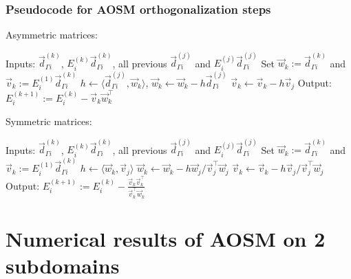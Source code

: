 \documentclass[10pt]{beamer}
\begin{document}
\begin{frame}
\frametitle{Pseudocode for AOSM orthogonalization steps}

Asymmetric matrices:
	\begin{algorithmic}[1]
		\State Inputs: $\vec{d}_{\Gamma i}^{(k)}$, $E_i^{(k)} \vec{d}_{\Gamma i}^{(k)}$, all previous $\vec{d}_{\Gamma i}^{(j)}$ and $E_i^{(j)} \vec{d}_{\Gamma i}^{(j)}$
		\State Set $\vec{w}_k := \vec{d}_{\Gamma i}^{(k)}$ and $\vec{v}_k := E_i^{(1)} \vec{d}_{\Gamma i}^{(k)}$
			\State $h \gets \langle \vec{d}_{\Gamma i}^{(j)}, \vec{w}_k \rangle$, $\vec{w}_k \gets \vec{w}_k - h \vec{d}_{\Gamma i}^{(j)}$
			\State $\vec{v}_k \gets \vec{v}_k - h \vec{v}_j$
		\EndFor
		\State Output: $E_i^{(k+1)} := E_i^{(k)} - \vec{v}_k \vec{w}_k^\top$
	\end{algorithmic}
\end{frame}
\begin{frame}
Symmetric matrices:
\begin{algorithmic}[1]
\State Inputs: $\vec{d}_{\Gamma i}^{(k)}$, $E_i^{(k)} \vec{d}_{\Gamma i}^{(k)}$, all previous $\vec{d}_{\Gamma i}^{(j)}$ and $E_i^{(j)} \vec{d}_{\Gamma i}^{(j)}$
\State Set $\vec{w}_k := \vec{d}_{\Gamma i}^{(k)}$ and $\vec{v}_k := E_i^{(1)} \vec{d}_{\Gamma i}^{(k)}$
	\State $h \gets \langle \vec{w}_k, \vec{v}_j \rangle$
	\State $\vec{w}_k \gets \vec{w}_k - h \vec{w}_j/\vec{v}_j^\top \vec{w}_j$
	\State $\vec{v}_k \gets \vec{v}_k - h \vec{v}_j / \vec{v}_j^\top \vec{w}_j$
\EndFor
\State Output: $E_i^{(k+1)} := E_i^{(k)} - \frac{\vec{v}_k \vec{v}_k^\top}{\vec{v}_k^\top \vec{w}_k}$
\end{algorithmic}

\end{frame}

\section{Numerical results of AOSM on 2 subdomains}
\end{document}
